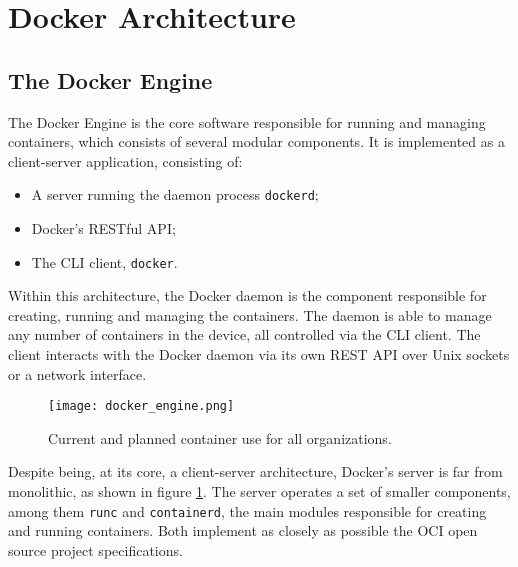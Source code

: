 \section{Docker Architecture}
\label{sec::arch}




\subsection{The Docker Engine}
\label{sec::arch:engine}
The Docker Engine is the core software responsible for running and managing containers, which consists of several modular components\cite{Docker-engine}. It is implemented as a client-server application, consisting of:

\begin{itemize}
    \item A server running the daemon process \texttt{dockerd};
    \item Docker's \acs{REST}ful \acs{API};
    \item The \acs{CLI} client, \texttt{docker}.
\end{itemize}

Within this architecture, the Docker daemon is the component responsible for creating, running and managing the containers. The daemon is able to manage any number of containers in the device, all controlled via the \acs{CLI} client. The client interacts with the Docker daemon via its own \acs{REST} \acs{API} over Unix sockets or a network interface\cite{Poulton2020-ju}.

\begin{figure}[!htb]
    \centering
    \texttt{[image: docker\_engine.png]}
    \caption{Current and planned container use for all organizations.}
    \label{fig:docker-engine-server}
\end{figure}

Despite being, at its core, a client-server architecture, Docker's server is far from monolithic, as shown in figure \ref{fig:docker-engine-server}. The server operates a set of smaller components, among them \texttt{runc} and \texttt{containerd}, the main modules responsible for creating and running containers. Both implement as closely as possible the OCI open source project specifications\cite{Poulton2020-ju, oci-runc, git-runc, docker-containerd}.

